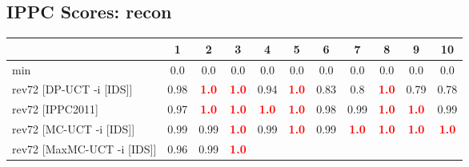 \documentclass{article}
\begin{document}
\bigskip

\subsection*{IPPC Scores: recon}

\begin{tabular}{|l|r@{$\pm$}rr@{$\pm$}rr@{$\pm$}rr@{$\pm$}rr@{$\pm$}rr@{$\pm$}rr@{$\pm$}rr@{$\pm$}rr@{$\pm$}rr@{$\pm$}r|}
\hline

& \multicolumn{2}{c}{1}
& \multicolumn{2}{c}{2}
& \multicolumn{2}{c}{3}
& \multicolumn{2}{c}{4}
& \multicolumn{2}{c}{5}
& \multicolumn{2}{c}{6}
& \multicolumn{2}{c}{7}
& \multicolumn{2}{c}{8}
& \multicolumn{2}{c}{9}
& \multicolumn{2}{c|}{10}
\\
\hline
\hline
min
& \multicolumn{2}{c}{0.0}
& \multicolumn{2}{c}{0.0}
& \multicolumn{2}{c}{0.0}
& \multicolumn{2}{c}{0.0}
& \multicolumn{2}{c}{0.0}
& \multicolumn{2}{c}{0.0}
& \multicolumn{2}{c}{0.0}
& \multicolumn{2}{c}{0.0}
& \multicolumn{2}{c}{0.0}
& \multicolumn{2}{c|}{0.0}
\\
rev72 [DP-UCT -i [IDS]]
& \multicolumn{2}{c}{0.98}
& \multicolumn{2}{c}{\textbf{\textcolor{red}{1.0}}}
& \multicolumn{2}{c}{\textbf{\textcolor{red}{1.0}}}
& \multicolumn{2}{c}{0.94}
& \multicolumn{2}{c}{\textbf{\textcolor{red}{1.0}}}
& \multicolumn{2}{c}{0.83}
& \multicolumn{2}{c}{0.8}
& \multicolumn{2}{c}{\textbf{\textcolor{red}{1.0}}}
& \multicolumn{2}{c}{0.79}
& \multicolumn{2}{c|}{0.78}
\\
rev72 [IPPC2011]
& \multicolumn{2}{c}{0.97}
& \multicolumn{2}{c}{\textbf{\textcolor{red}{1.0}}}
& \multicolumn{2}{c}{\textbf{\textcolor{red}{1.0}}}
& \multicolumn{2}{c}{\textbf{\textcolor{red}{1.0}}}
& \multicolumn{2}{c}{\textbf{\textcolor{red}{1.0}}}
& \multicolumn{2}{c}{0.98}
& \multicolumn{2}{c}{0.99}
& \multicolumn{2}{c}{\textbf{\textcolor{red}{1.0}}}
& \multicolumn{2}{c}{\textbf{\textcolor{red}{1.0}}}
& \multicolumn{2}{c|}{0.99}
\\
rev72 [MC-UCT -i [IDS]]
& \multicolumn{2}{c}{0.99}
& \multicolumn{2}{c}{0.99}
& \multicolumn{2}{c}{\textbf{\textcolor{red}{1.0}}}
& \multicolumn{2}{c}{0.99}
& \multicolumn{2}{c}{\textbf{\textcolor{red}{1.0}}}
& \multicolumn{2}{c}{0.99}
& \multicolumn{2}{c}{\textbf{\textcolor{red}{1.0}}}
& \multicolumn{2}{c}{\textbf{\textcolor{red}{1.0}}}
& \multicolumn{2}{c}{\textbf{\textcolor{red}{1.0}}}
& \multicolumn{2}{c|}{\textbf{\textcolor{red}{1.0}}}
\\
rev72 [MaxMC-UCT -i [IDS]]
& \multicolumn{2}{c}{0.96}
& \multicolumn{2}{c}{0.99}
& \multicolumn{2}{c}{\textbf{\textcolor{red}{1.0}}}

\end{tabular}
\end{document}
